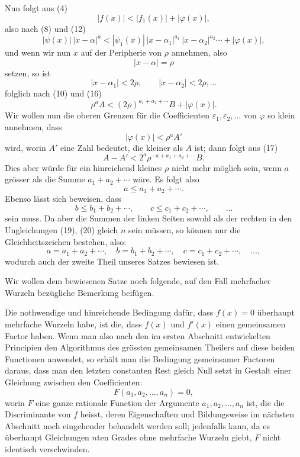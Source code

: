 \documentclass[11pt]{article}
\begin{document}
Nun folgt aus (4)
\begin{equation}
 |f(x)|<|f_1(x)|+|\varphi(x)|,
\tag{15}
\end{equation}
also nach (8) und (12)
\begin{equation}
 |\psi(x)|\,|x-\alpha|^a<|\psi_1(x)|\,|x-\alpha_1|^{a_1}\,|x-\alpha_2|^{a_2}\cdots+|\varphi(x)|,
\tag{16}
\end{equation}
und wenn wir nun $x$ auf der Peripherie von $\rho$ annehmen, also
\[
 |x-\alpha|=\rho
\]
setzen, so ist
\[
 |x-\alpha_1|<2\rho,
 \qquad |x-\alpha_2|<2\rho,
 \ldots
\]
folglich nach (10) und (16)
\begin{equation}
 \rho^a A <(2\rho)^{a_1+a_2+\cdots}B+|\varphi(x)|.
\tag{17}
\end{equation}
Wir wollen nun die oberen Grenzen für die Coefficienten $\varepsilon_1,\varepsilon_2,
\ldots$ von $\varphi$ so klein annehmen, dass
\[
 |\varphi(x)|<\rho^aA'
\]
wird, worin $A'$ eine Zahl bedeutet, die kleiner als $A$ ist; dann folgt aus (17)
\begin{equation}
 A-A'<2^a\rho^{-a+a_1+a_2+\cdots}B.
\tag{18}
\end{equation}
Dies aber würde für ein hinreichend kleines $\rho$ nicht mehr möglich sein, wenn $a$ grösser als die Summe $a_1+a_2+\cdots$ wäre. Es folgt also
\begin{equation}
 a\le a_1+a_2+\cdots .
\tag{19}
\end{equation}
Ebenso lässt sich beweisen, dass
\begin{equation}
 b\le b_1+b_2+\cdots,
 \qquad
 c\le c_1+c_2+\cdots,
 \qquad \ldots
\tag{20}
\end{equation}
sein muss. Da aber die Summen der linken Seiten sowohl als der rechten in den Ungleichungen (19), (20) gleich $n$ sein müssen, so können nur die Gleichheitszeichen bestehen, also:
\[
 a=a_1+a_2+\cdots,
 \quad b=b_1+b_2+\cdots,
 \quad c=c_1+c_2+\cdots,
 \quad \ldots,
\]
wodurch auch der zweite Theil unseres Satzes bewiesen ist.

Wir wollen dem bewiesenen Satze noch folgende, auf den Fall mehrfacher Wurzeln bezügliche Bemerkung beifügen.

Die nothwendige und hinreichende Bedingung dafür, dass $f(x)=0$ überhaupt mehrfache Wurzeln habe, ist die, dass $f(x)$ und $f'(x)$ einen gemeinsamen Factor haben. Wenn man also nach den im ersten Abschnitt entwickelten Principien den Algorithmus des grössten gemeinsamen Theilers auf diese beiden Functionen anwendet, so erhält man die Bedingung gemeinsamer Factoren daraus, dass man den letzten constanten Rest gleich Null setzt in Gestalt einer Gleichung zwischen den Coefficienten:
\[
 F(a_1,a_2,\ldots,a_n)=0,
\]
worin $F$ eine ganze rationale Function der Argumente $a_1,a_2,
\ldots,a_n$ ist, die die Discriminante von $f$ heisst, deren Eigenschaften und Bildungsweise im nächsten Abschnitt noch eingehender behandelt werden soll; jedenfalls kann, da es überhaupt Gleichungen $n$ten Grades ohne mehrfache Wurzeln giebt, $F$ nicht identisch verschwinden.
\end{document}
